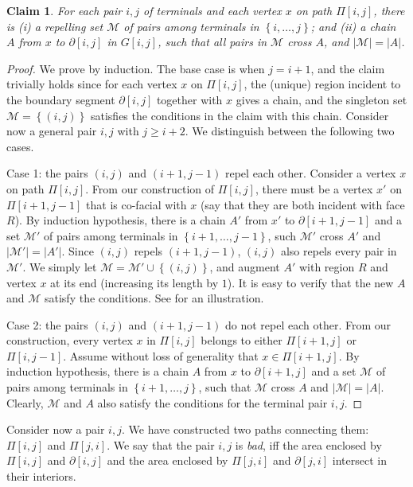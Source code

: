 \documentclass[11pt]{article}
\newtheorem{claim}[theorem]{Claim}
\newcommand{\mset}{{\mathcal M}}
\newcommand{\set}[1]{\left\{ #1 \right\}}
\begin{document}
\begin{claim}
\label{clm: tight cut}
For each pair $i,j$ of terminals and each vertex $x$ on path $\Pi[i,j]$, there is (i) a repelling set $\mset$ of pairs among terminals in $\set{i,\ldots,j}$; and (ii) a chain $A$ from $x$ to $\partial[i,j]$ in $G[i,j]$, such that all pairs in $\mset$ cross $A$, and $|\mset|=|A|$.
\end{claim}
\begin{proof}
We prove by induction. The base case is when $j=i+1$, and the claim trivially holds since for each vertex $x$ on $\Pi[i,j]$, the (unique) region incident to the boundary segment $\partial[i,j]$ together with $x$ gives a chain, and the singleton set $\mset=\set{(i,j)}$ satisfies the conditions in the claim with this chain.
Consider now a general pair $i,j$ with $j\ge i+2$. We distinguish between the following two cases.

Case 1: the pairs $(i,j)$ and $(i+1,j-1)$ repel each other. 
Consider a vertex $x$ on path $\Pi[i,j]$. From our construction of $\Pi[i,j]$, there must be a vertex $x'$ on $\Pi[i+1,j-1]$ that is co-facial with $x$ (say that they are both incident with face $R$).
By induction hypothesis, there is a chain $A'$ from $x'$ to $\partial[i+1,j-1]$ and a set $\mset'$ of pairs among terminals in $\set{i+1,\ldots,j-1}$, such $\mset'$ cross $A'$ and $|\mset'|=|A'|$. Since $(i,j)$ repels $(i+1,j-1)$, $(i,j)$ also repels every pair in $\mset'$. We simply let $\mset=\mset'\cup \set{(i,j)}$, and augment $A'$ with region $R$ and vertex $x$ at its end (increasing its length by $1$). It is easy to verify that the new $A$ and $\mset$ satisfy the conditions. See  for an illustration.

Case 2: the pairs $(i,j)$ and $(i+1,j-1)$ do not repel each other. From our construction, every vertex $x$ in $\Pi[i,j]$ belongs to either $\Pi[i+1,j]$ or $\Pi[i,j-1]$. Assume without loss of generality that $x\in \Pi[i+1,j]$. By induction hypothesis, there is a chain $A$ from $x$ to $\partial[i+1,j]$ and a set $\mset$ of pairs among terminals in $\set{i+1,\ldots,j}$, such that $\mset$ cross $A$ and $|\mset|=|A|$. Clearly, $\mset$ and $A$ also satisfy the conditions for the terminal pair $i,j$.
\end{proof}

Consider now a pair $i,j$. We have constructed two paths connecting them: $\Pi[i,j]$ and $\Pi[j,i]$. We say that the pair $i,j$ is \emph{bad}, iff the area enclosed by $\Pi[i,j]$ and $\partial[i,j]$ and the area enclosed by $\Pi[j,i]$ and $\partial[j,i]$ intersect in their interiors.
\end{document}
